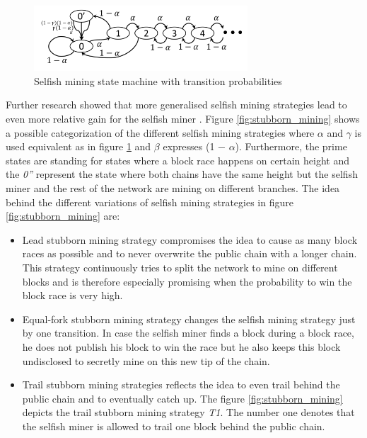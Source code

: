 \documentclass{scrartcl}
\begin{document}
\begin{figure}[t]
\includegraphics[width=8cm]{figures/selfish_mining}
\centering
\caption{Selfish mining state machine with transition probabilities \cite{eyal2014majority}}
\label{fig:selfish_mining}
\end{figure}


Further research showed that more generalised selfish mining strategies lead to even more relative gain for the selfish miner \cite{nayak2016stubborn,sapirshtein2016optimal, gervais2015tampering, gervais2016security, bahack2013theoretical}. Figure \ref{fig:stubborn_mining} shows a possible categorization of the different selfish mining strategies where $\alpha$ and $\gamma$ is used equivalent as in figure \ref{fig:selfish_mining} and $\beta$ expresses (1 − $\alpha$). Furthermore, the prime states are standing for states where a block race happens on certain height and the \textit{0''} represent the state where both chains have the same height but the selfish miner and the rest of the network are mining on different branches. The idea behind the different variations of selfish mining strategies in figure \ref{fig:stubborn_mining} are:
\begin{itemize}
\item Lead stubborn mining strategy compromises the idea to cause as many block races as possible and to never overwrite the public chain with a longer chain. This strategy continuously tries to split the network to mine on different blocks and is therefore especially promising when the probability to win the block race is very high.
\item Equal-fork stubborn mining strategy changes the selfish mining strategy just by one transition. In case the selfish miner finds a block during a block race, he does not publish his block to win the race but he also keeps this block undisclosed to secretly mine on this new tip of the chain.
\item Trail stubborn mining strategies reflects the idea to even trail behind the public chain and to eventually catch up. The figure \ref{fig:stubborn_mining} depicts the trail stubborn mining strategy \textit{T1}. The number one denotes that the selfish miner is allowed to trail one block behind the public chain.
\end{itemize}
\end{document}
